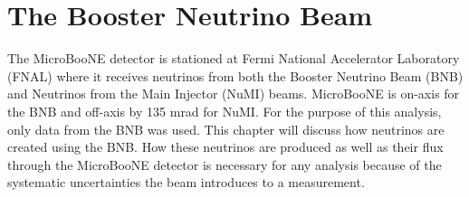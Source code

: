 \chapter{The Booster Neutrino Beam}\label{ch:beam}

The MicroBooNE detector is stationed at Fermi National Accelerator Laboratory (FNAL) where it receives neutrinos from both the Booster Neutrino Beam (BNB) and Neutrinos from the Main Injector (NuMI) beams. MicroBooNE is on-axis for the BNB and off-axis by 135 mrad for NuMI. For the purpose of this analysis, only data from the BNB was used. This chapter will discuss how neutrinos are created using the BNB. How these neutrinos are produced as well as their flux through the MicroBooNE detector is necessary for any analysis because of the systematic uncertainties the beam introduces to a measurement.

